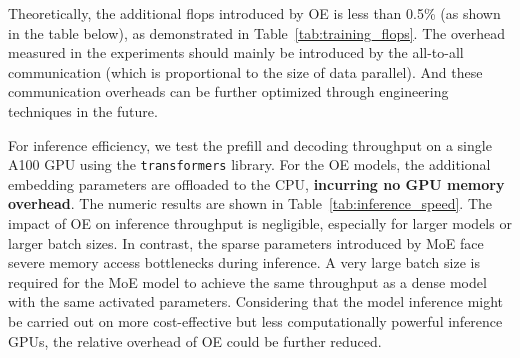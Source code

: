 Theoretically, the additional flops introduced by OE is less than 0.5\% (as shown in the table below), as demonstrated in Table~\ref{tab:training_flops}. The overhead measured in the experiments should mainly be introduced by the all-to-all communication (which is proportional to the size of data parallel). And these communication overheads can be further optimized through engineering techniques in the future.

For inference efficiency, we test the prefill and decoding throughput on a single A100 GPU using the \texttt{transformers} library. For the OE models, the additional embedding parameters are offloaded to the CPU, \textbf{incurring no GPU memory overhead}. The numeric results are shown in Table~\ref{tab:inference_speed}. The impact of OE on inference throughput is negligible, especially for larger models or larger batch sizes. In contrast, the sparse parameters introduced by MoE face severe memory access bottlenecks during inference. A very large batch size is required for the MoE model to achieve the same throughput as a dense model with the same activated parameters. Considering that the model inference might be carried out on more cost-effective but less computationally powerful inference GPUs, the relative overhead of OE could be further reduced.

